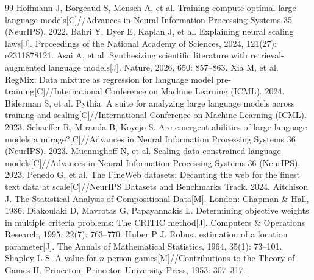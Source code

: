 \begin{thebibliography}{99}\small
{} Hoffmann J, Borgeaud S, Mensch A, et al. Training compute-optimal large language models[C]//Advances in Neural Information Processing Systems 35 (NeurIPS). 2022.
 Bahri Y, Dyer E, Kaplan J, et al. Explaining neural scaling laws[J]. Proceedings of the National Academy of Sciences, 2024, 121(27): e2311878121.
 Asai A, et al. Synthesizing scientific literature with retrieval-augmented language models[J]. Nature, 2026, 650: 857--863.
 Xia M, et al. RegMix: Data mixture as regression for language model pre-training[C]//International Conference on Machine Learning (ICML). 2024.
 Biderman S, et al. Pythia: A suite for analyzing large language models across training and scaling[C]//International Conference on Machine Learning (ICML). 2023.
 Schaeffer R, Miranda B, Koyejo S. Are emergent abilities of large language models a mirage?[C]//Advances in Neural Information Processing Systems 36 (NeurIPS). 2023.
 Muennighoff N, et al. Scaling data-constrained language models[C]//Advances in Neural Information Processing Systems 36 (NeurIPS). 2023.
 Penedo G, et al. The FineWeb datasets: Decanting the web for the finest text data at scale[C]//NeurIPS Datasets and Benchmarks Track. 2024.
 Aitchison J. The Statistical Analysis of Compositional Data[M]. London: Chapman \& Hall, 1986.
 Diakoulaki D, Mavrotas G, Papayannakis L. Determining objective weights in multiple criteria problems: The CRITIC method[J]. Computers \& Operations Research, 1995, 22(7): 763--770.
 Huber P J. Robust estimation of a location parameter[J]. The Annals of Mathematical Statistics, 1964, 35(1): 73--101.
 Shapley L S. A value for $n$-person games[M]//Contributions to the Theory of Games II. Princeton: Princeton University Press, 1953: 307--317.
\end{thebibliography}
